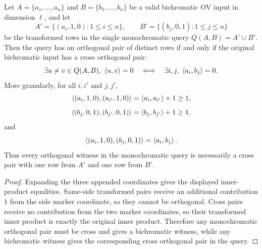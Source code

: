\begin{lemma}
  \label{lem:bi-to-mono-ov-query-equivalence}
  Let $A=\{a_1,\ldots,a_n\}$ and $B=\{b_1,\ldots,b_n\}$ be a valid bichromatic
  OV input in dimension $\ell$, and let
  \[
    A'=\{(a_i,1,0):1\leq i\leq n\},\qquad
    B'=\{(b_j,0,1):1\leq j\leq n\}
  \]
  be the transformed rows in the single monochromatic query
  $Q(A,B)=A'\cup B'$.  Then the query has an orthogonal pair of distinct rows
  if and only if the original bichromatic input has a cross orthogonal pair:
  \[
    \exists u\neq v\in Q(A,B),\ \left\langle u,v\right\rangle=0
    \quad\Longleftrightarrow\quad
    \exists i,j,\ \left\langle a_i,b_j\right\rangle=0.
  \]
  More granularly, for all $i,i'$ and $j,j'$,
  \[
    \left\langle (a_i,1,0),(a_{i'},1,0)\right\rangle=\left\langle a_i,a_{i'}\right\rangle+1\geq1,
  \]
  \[
    \left\langle (b_j,0,1),(b_{j'},0,1)\right\rangle=\left\langle b_j,b_{j'}\right\rangle+1\geq1,
  \]
  and
  \[
    \left\langle (a_i,1,0),(b_j,0,1)\right\rangle=\left\langle a_i,b_j\right\rangle.
  \]
  Thus every orthogonal witness in the monochromatic query is necessarily a
  cross pair with one row from $A'$ and one row from $B'$.
\end{lemma}
\begin{proof}
  Expanding the three appended coordinates gives the displayed inner-product
  equalities.  Same-side transformed pairs receive an additional contribution
  $1$ from the side marker coordinate, so they cannot be orthogonal.  Cross
  pairs receive no contribution from the two marker coordinates, so their
  transformed inner product is exactly the original inner product.  Therefore
  any monochromatic orthogonal pair must be cross and gives a bichromatic
  witness, while any bichromatic witness gives the corresponding cross
  orthogonal pair in the query.
\end{proof}

